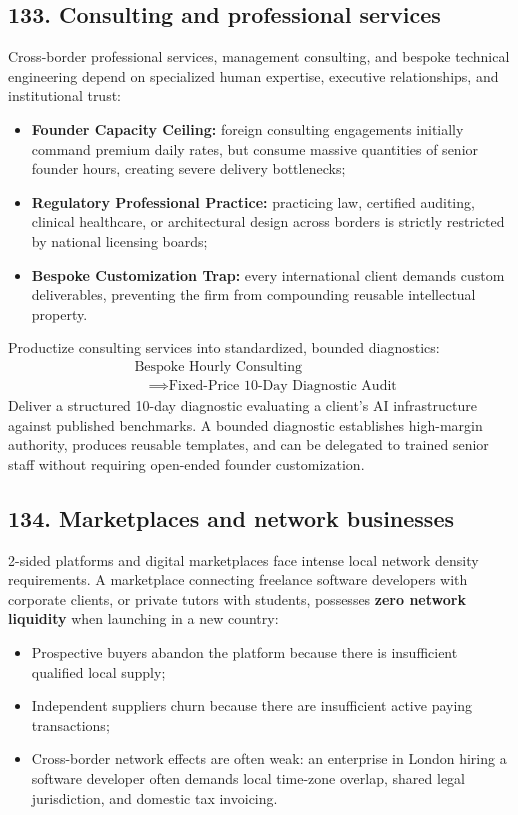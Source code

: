 \subsection{133. Consulting and professional services}

Cross-border professional services, management consulting, and bespoke technical engineering depend on specialized human expertise, executive relationships, and institutional trust:
\begin{itemize}
    \item \textbf{Founder Capacity Ceiling:} foreign consulting engagements initially command premium daily rates, but consume massive quantities of senior founder hours, creating severe delivery bottlenecks;
    \item \textbf{Regulatory Professional Practice:} practicing law, certified auditing, clinical healthcare, or architectural design across borders is strictly restricted by national licensing boards;
    \item \textbf{Bespoke Customization Trap:} every international client demands custom deliverables, preventing the firm from compounding reusable intellectual property.
\end{itemize}

Productize consulting services into standardized, bounded diagnostics:
\begin{equation}
\begin{aligned}
&\text{Bespoke Hourly Consulting} \\
&\quad \implies \text{Fixed-Price 10-Day Diagnostic Audit}
\end{aligned}
\end{equation}
Deliver a structured 10-day diagnostic evaluating a client's AI infrastructure against published benchmarks. A bounded diagnostic establishes high-margin authority, produces reusable templates, and can be delegated to trained senior staff without requiring open-ended founder customization.

\subsection{134. Marketplaces and network businesses}

2-sided platforms and digital marketplaces face intense local network density requirements. A marketplace connecting freelance software developers with corporate clients, or private tutors with students, possesses \textbf{zero network liquidity} when launching in a new country:
\begin{itemize}
    \item Prospective buyers abandon the platform because there is insufficient qualified local supply;
    \item Independent suppliers churn because there are insufficient active paying transactions;
    \item Cross-border network effects are often weak: an enterprise in London hiring a software developer often demands local time-zone overlap, shared legal jurisdiction, and domestic tax invoicing.
\end{itemize}

